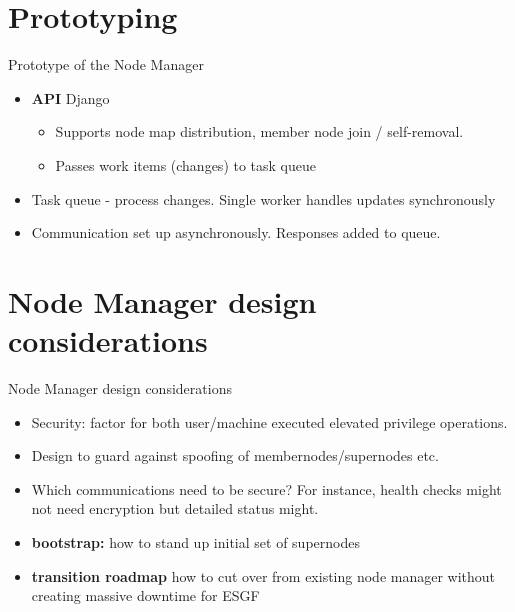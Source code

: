 \documentclass{beamer}
\begin{document}
\section{Prototyping}
\begin{frame}{Prototype of the Node Manager}
\begin{itemize}
\item
\textbf{API} Django
\begin{itemize}
 \item Supports node map distribution, member node join / self-removal.
\item
Passes work items (changes) to task queue
\end{itemize}
\item Task queue  - process changes.  Single worker handles updates synchronously

\item
Communication set up asynchronously. Responses added to queue.  

\end{itemize}

\end{frame}





\section{Node Manager design considerations}
\begin{frame}{Node Manager design considerations}
\begin{itemize}
\item Security: factor for both user/machine executed elevated privilege operations.
\item Design to guard against spoofing of membernodes/supernodes etc.
\item
 Which communications need to be secure? For instance, health checks might not need encryption but detailed status might.
\item 
\textbf{bootstrap:} how to stand up initial set of supernodes
\item
\textbf{transition roadmap} how to cut over from existing node manager without creating massive downtime for ESGF


\end{itemize}
\end{frame}
\end{document}
